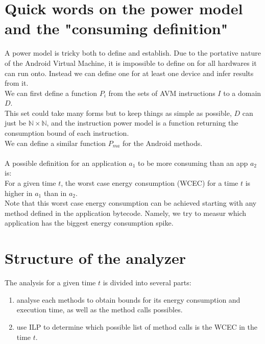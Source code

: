 \documentclass{article}
\begin{document}
\section*{Quick words on the power model and the "consuming definition"}

A power model is tricky both to define and establish. Due to the portative nature of the Android Virtual Machine, it is impossible to define on for all hardwares it can run onto.
Instead we can define one for at least one device and infer results from it.\\
We can first define a function $P_i$ from the sets of AVM instructions $I$ to a domain $D$. \\
This set could take many forms but to keep things as simple as possible, $D$ can just be $\mathbb N\times\mathbb N$, and the instruction power model is a function returning the consumption bound of each instruction.\\
We can define a similar function $P_{ma}$ for the Android methods.\\\\
A possible definition for an application $a_1$ to be more consuming than an app $a_2$ is: \\
For a given time $t$, the worst case energy consumption (WCEC) for a time $t$ is higher in $a_1$ than in $a_2$.\\
Note that this worst case energy consumption can be achieved starting with any method defined in the application bytecode. Namely, we try to measur which application has the biggest energy consumption spike.
\section*{Structure of the analyzer}

The analysis for a given time $t$ is divided into several parts:
\begin{enumerate}
    \item analyse each methods to obtain bounds for its energy consumption and execution time, as well as the method calls possibles.
    \item use ILP to determine which possible list of method calls is the WCEC in the time $t$.
\end{enumerate}
\end{document}
